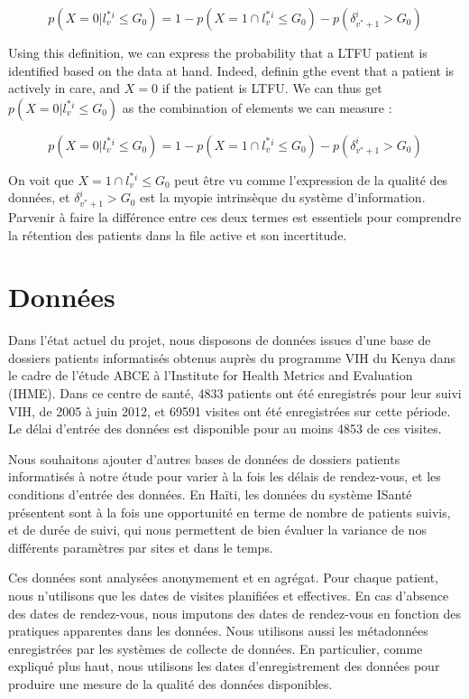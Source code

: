 \documentclass[paper=a4, fontsize=11pt]{scrartcl}
\numberwithin{equation}{section}		%
\numberwithin{figure}{section}			%
\numberwithin{table}{section}				%
\begin{document}
$$p(X = 0 | l_v^{*}^i \leq  G_0) = 1 - p(X = 1  \cap l_v^{*}^i \leq  G_0) - p(\delta_{v^*+1}^i > G_0) $$

Using this definition, we can express the probability that a LTFU patient is identified based on the data at hand. Indeed, definin gthe event that a patient is actively in care, and $X = 0$ if the patient is LTFU. We can thus get $p(X = 0 | l_v^{*}^i \leq  G_0)$ as the combination of elements we can measure :

$$p(X = 0 | l_v^{*}^i \leq  G_0) = 1 - p(X = 1  \cap l_v^{*}^i \leq  G_0) - p(\delta_{v^*+1}^i > G_0) $$

On voit que $X = 1  \cap l_v^{*}^i \leq  G_0$ peut être vu comme l'expression de la qualité des données, et $\delta_{v^*+1}^i > G_0$ est la myopie intrinsèque du système d'information. Parvenir à faire la différence entre ces deux termes est essentiels pour comprendre la rétention des patients dans la file active et son incertitude.

\section{Données}

Dans l'état actuel du projet, nous disposons de données issues d'une base de dossiers patients informatisés obtenus auprès du programme VIH du Kenya dans le cadre de l'étude ABCE à l'Institute for Health Metrics and Evaluation (IHME). Dans ce centre de santé, 4833 patients ont été enregistrés pour leur suivi VIH, de 2005 à juin 2012, et 69591 visites ont été enregistrées sur cette période. Le délai d'entrée des données est disponible pour au moins 4853 de ces visites.

Nous souhaitons ajouter d'autres bases de données de dossiers patients informatisés à notre étude pour varier à la fois les délais de rendez-vous, et les conditions d'entrée des données. En Haïti, les données du système ISanté présentent sont à la fois une opportunité en terme de nombre de patients suivis, et de durée de suivi, qui nous permettent de bien évaluer la variance de nos différents paramètres par sites et dans le temps.

Ces données sont analysées anonymement et en agrégat. Pour chaque patient, nous n'utilisons que les dates de visites planifiées et effectives. En cas d'absence des dates de rendez-vous, nous imputons des dates de rendez-vous en fonction des pratiques apparentes dans les données. Nous utilisons aussi les métadonnées enregistrées par les systèmes de collecte de données. En particulier, comme expliqué plus haut, nous utilisons les dates d'enregistrement des données pour produire une mesure de la qualité des données disponibles.
\end{document}
